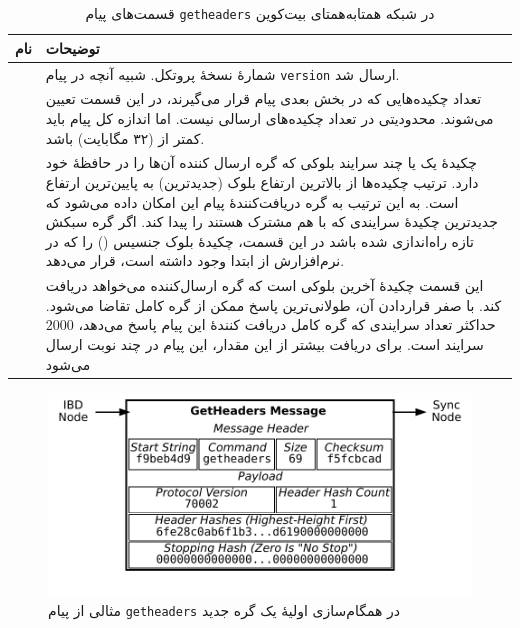 \begin{xltabular}{\textwidth}{|c|X|}
	\caption{
		قسمت‌های پیام \texttt{getheaders} در شبکه همتا‌به‌همتای بیت‌کوین
		\label{table:GetHeadersMessage}}\\
	\hline
	\textbf{نام} & {\textbf{توضیحات}} \\
	\hline \hline
	 & {%
		شماره‌ٔ نسخه‌ٔ پروتکل. شبیه آنچه در پیام \texttt{version} ارسال شد.
	} \\
	
	\hline
	
	 & {%
		تعداد چکیده‌هایی که در بخش بعدی پیام قرار می‌گیرند، در این قسمت تعیین می‌شوند. محدودیتی در تعداد چکیده‌های ارسالی نیست. اما اندازه کل پیام باید کمتر از  (۳۲ مگابایت) باشد.
	} \\
	\hline
	
	
	 & {%
		چکیدهٔ یک یا چند سرایند بلوکی که گره ارسال کننده آن‌ها را در حافظهٔ خود دارد. ترتیب چکیده‌ها از بالاترین ارتفاع بلوک (جدید‌ترین) به پایین‌ترین ارتفاع است. به این ترتیب به گره دریافت‌کننده‌ٔ پیام این امکان داده می‌شود که جدیدترین چکیدهٔ سرایندی که با هم مشترک هستند را پیدا کند. اگر گره سبکش تازه راه‌اندازی شده‌ باشد در این قسمت، چکیدهٔ بلوک جنسیس () را که در نرم‌افزارش از ابتدا وجود داشته است، قرار می‌دهد.
	} \\
	\hline
	
	 & {%
		این قسمت چکیدهٔ آخرین بلوکی است که گره ارسال‌کننده می‌خواهد دریافت کند. با صفر قراردادن آن، طولانی‌ترین پاسخ ممکن از گره کامل تقاضا می‌شود. حداکثر تعداد سرایندی که گره کامل دریافت کنندهٔ این پیام پاسخ می‌دهد، $2000$ سرایند است. برای دریافت بیشتر از این مقدار، این پیام در چند نوبت ارسال می‌شود
	}\\
	\hline
	
\end{xltabular}

\begin{figure}[h]
	\centering
	\includegraphics[width=0.7\linewidth]{image/getheaders}
	\caption{مثالی از پیام \texttt{getheaders} در همگام‌سازی اولیهٔ یک گره جدید}
	\label{fig:getheaders}
\end{figure}


